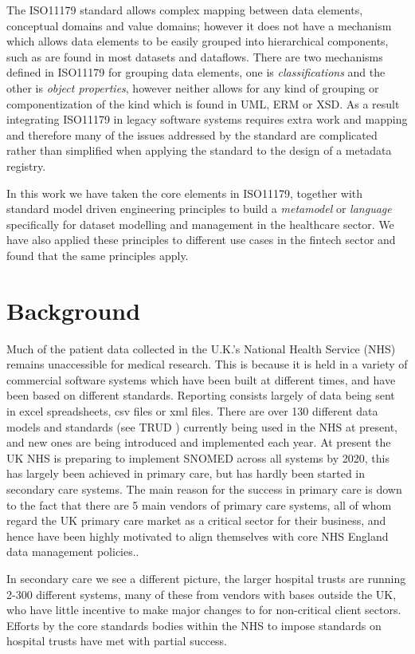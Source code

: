 \documentclass{llncs}
\begin{document}
	The ISO11179 standard allows complex mapping between data elements, conceptual domains and value domains; however it does not have a mechanism which allows data elements to be easily grouped into hierarchical components, such as are found in most datasets and dataflows. There are two mechanisms defined in ISO11179 for grouping data elements, one is \emph{classifications} and the other is \emph{object properties}, however neither allows for any kind of grouping or componentization of the kind which is found in UML, ERM or XSD. As a result integrating ISO11179 in legacy software systems requires extra work and mapping and therefore many of the issues addressed by the standard are complicated rather than simplified when applying the standard to the design of a metadata registry. 
	
	In this work we have taken the core elements in ISO11179, together with standard model driven engineering principles to build a \emph{metamodel} or \emph{language} specifically for dataset modelling and management in the healthcare sector. We have also applied these principles to different use cases in the fintech sector and found that the same principles apply.
	
	
	\section{Background}
	
	Much of the patient data collected in the U.K.'s National Health Service (NHS) remains unaccessible for medical research. This is because it is held in a variety of commercial software systems which have been built at different times, and have been based on different standards. Reporting consists largely of data being sent in excel spreadsheets, csv files or xml files.  There are over 130 different data models and standards (see TRUD \cite{TRUD2017}) currently being used in the NHS at present, and new ones are being introduced and implemented each year. At present the UK NHS is preparing to implement SNOMED across all systems by 2020, this has largely been achieved in primary care, but has hardly been started in secondary care systems. The main reason for the success in primary care is down to the fact that there are 5 main vendors of primary care systems, all of whom regard the UK primary care market as a critical sector for their business, and hence have been highly motivated to align themselves with core NHS England data management policies..  
	
	In secondary care we see a different picture, the larger hospital trusts are running 2-300 different systems, many of these from vendors with bases outside the UK, who have little incentive to make major changes to for non-critical client sectors. Efforts by the core standards bodies within the NHS to impose standards on hospital trusts have met with partial success. 
	
\end{document}
